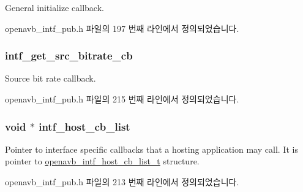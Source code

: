 General initialize callback. 



openavb\+\_\+intf\+\_\+pub.\+h 파일의 197 번째 라인에서 정의되었습니다.

\subsubsection[{\texorpdfstring{intf\+\_\+get\+\_\+src\+\_\+bitrate\+\_\+cb}{intf_get_src_bitrate_cb}}]{ intf\+\_\+get\+\_\+src\+\_\+bitrate\+\_\+cb}\hypertarget{structopenavb__intf__cb__t_a43b6a9d9343f06ff21f680a90c9529f6}{}\label{structopenavb__intf__cb__t_a43b6a9d9343f06ff21f680a90c9529f6}


Source bit rate callback. 



openavb\+\_\+intf\+\_\+pub.\+h 파일의 215 번째 라인에서 정의되었습니다.

\subsubsection[{\texorpdfstring{intf\+\_\+host\+\_\+cb\+\_\+list}{intf_host_cb_list}}]{\setlength{\rightskip}{0pt plus 5cm}void $\ast$ intf\+\_\+host\+\_\+cb\+\_\+list}\hypertarget{structopenavb__intf__cb__t_a1fdbb23f1c7df7b98789575ef4f94f6b}{}\label{structopenavb__intf__cb__t_a1fdbb23f1c7df7b98789575ef4f94f6b}
Pointer to interface specific callbacks that a hosting application may call. It is pointer to \hyperlink{structopenavb__intf__host__cb__list__t}{openavb\+\_\+intf\+\_\+host\+\_\+cb\+\_\+list\+\_\+t} structure. 

openavb\+\_\+intf\+\_\+pub.\+h 파일의 213 번째 라인에서 정의되었습니다.

